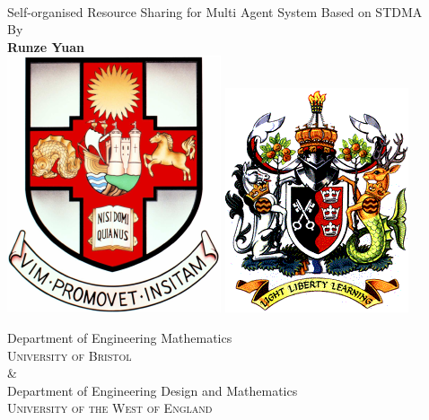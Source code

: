 \documentclass[12pt, oneside]{article}
\begin{document}
\begin{titlepage}
    \begin{center}
        \vspace*{1cm}
        {\huges
         \\
         \vspace{0.3cm}
         \large{Self-organised Resource Sharing for Multi Agent System Based on STDMA}
        \vspace{0.5cm}
        \\
        {\large By}
        \\
        \vspace{0.5cm}
        \textbf{Runze Yuan}
   		\vspace{1.5cm}
        \\
        \vspace{0.25cm}
       \includegraphics[scale=0.6]{logos/bristolcrest_colour.pdf}
        \hspace{5mm}
        \includegraphics[scale=0.35]{logos/UWE_insignia.png}

        \vspace{10mm}
        {\large Department of Engineering Mathematics\\
        \textsc{University of Bristol}}
        \\
        \&
        \\
        {\large Department of Engineering Design and Mathematics\\
        \textsc{University of the West of England}}\\

}
\end{center}
\end{titlepage}
\end{document}
